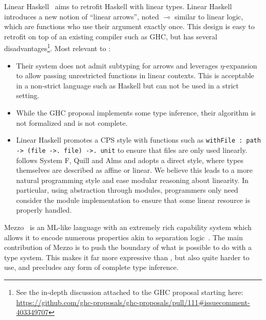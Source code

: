 Linear Haskell~\citep{DBLP:journals/pacmpl/BernardyBNJS18} aims
to retrofit Haskell with linear types.
Linear Haskell introduces a new notion
of ``linear arrows'', noted $\multimap$ similar to linear logic,
which are functions who use their argument exactly once.
This design is easy to retrofit on top of an existing compiler
such as GHC, but has several disadvantages\footnote{
  See the in-depth discussion attached to the GHC proposal starting here: \url{https://github.com/ghc-proposals/ghc-proposals/pull/111\#issuecomment-403349707}}.
Most relevant to \lang:
\begin{itemize}
\item Their system does not admit subtyping for arrows and leverages
  $\eta$-expansion to allow passing unrestricted functions in linear
  contexts. This is acceptable in a non-strict language such as
  Haskell but can not be used in a strict setting.
\item
  While the GHC proposal implements some type inference,
  their algorithm is not formalized and is not complete.
\item
  Linear Haskell promotes a CPS style with functions such as 
  \lstinline/withFile : path -> (file ->. file) ->. unit/
  to ensure that files are only used linearly.
  \lang follows System F\degree, Quill and Alms and
  adopts a direct style, where types themselves are
  described as affine or linear.
  We believe this leads to a more natural programming style
  and ease modular reasoning about linearity.
  In particular, using abstraction through modules,
  programmers only need consider the module
  implementation to ensure that some linear
  resource is properly handled.
\end{itemize}

Mezzo~\citep{DBLP:phd/hal/Protzenko14} is an ML-like language
with an extremely rich capability system which allows it to encode numerous
properties akin to separation logic~\citep{DBLP:conf/lics/Reynolds02}.
The main contribution of Mezzo is to push the boundary of what is possible
to do with a type system. This makes it far more expressive than \lang, but
also quite harder to use, and precludes any form of complete type
inference.


